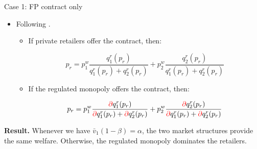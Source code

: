 \documentclass{class}
\begin{document}
\begin{frame}{Case 1: FP contract only}\label{CaseRamsey}

\begin{itemize}
    \item Following \cite{joskow2006retail}. \vfill

\begin{itemize}

    \item If private retailers offer the contract, then:

\begin{equation*}
 p_r = p_1^w  \frac{q_1^r(p_r)}{ q_1^r(p_r) + q_2^r(p_r) } + p_2^w \frac{ q_2^r(p_r)}{ q_1^r(p_r) + q_2^r(p_r) }
\end{equation*}

\vfill

\item If the regulated monopoly offers the contract, then:


 \begin{equation*}
 p_r = p_1^w \frac{ \textcolor{red}{\partial} q_1^{r}(p_r)}{ \textcolor{red}{\partial} q_1^{r}(p_r) + \textcolor{red}{\partial} q_2^{r}(p_r) } + p_2^w\frac{ \textcolor{red}{\partial} q_2^{r}(p_r)}{ \textcolor{red}{\partial} q_1^{r}(p_r) + \textcolor{red}{\partial} q_2^{r}(p_r) }
 \end{equation*}

   \end{itemize}
\end{itemize}    

\vfill

\textbf{Result.}  Whenever we have $\bar{v}_1 (1 - \beta) = \alpha$, the two market structures provide the same welfare. Otherwise, the regulated monopoly dominates the retailers.

\vfill

\hyperlink{RamseyOutside}{} 

\end{frame}

\end{document}
